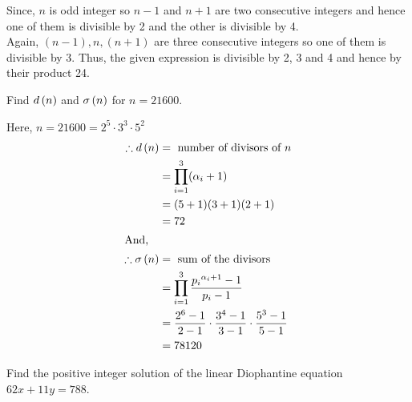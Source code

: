 \documentclass[12pt,class=book,crop=false]{standalone}
\begin{document}
\begin{soln}
    Since, $ n $ is odd integer so $ n-1 $ and $ n+1 $ are two consecutive integers and hence one of them is divisible by 2 and the other is divisible by 4.\\

    Again, $ (n-1),n,(n+1) $ are three consecutive integers so one of them is divisible by 3. Thus, the given expression is divisible by 2, 3 and 4 and hence by their product 24.
\end{soln}
\begin{qn}
    Find $ d\left( n \right) $ and $ \sigma\left( n \right) $ for $ n=21600 $.
\end{qn}
\begin{soln}
    Here, $ n=21600=2^5\cdot3^3\cdot5^2 $\\
    \begin{align*}
        \therefore d\left( n \right)&=\text{ number of divisors of } n\\
        &=\prod_{i=1}^3 (\alpha_i+1)\\
        &=(5+1)(3+1)(2+1)\\
        &=72\\
        \intertext{And,}
        \therefore \sigma\left( n \right)&=\text{ sum of the divisors }\\
        &=\prod_{i=1}^3 \frac{{p_i}^{\alpha_i+1}-1}{p_i-1}\\
        &=\frac{2^{6}-1}{2-1}\cdot \frac{3^{4}-1}{3-1}\cdot\frac{5^{3}-1}{5-1}\\
        &=78120\\
    \end{align*}
\end{soln}
\begin{qn}
    Find the positive integer solution of the linear Diophantine equation $ 62x+11y=788 $.
\end{qn}
\end{document}
